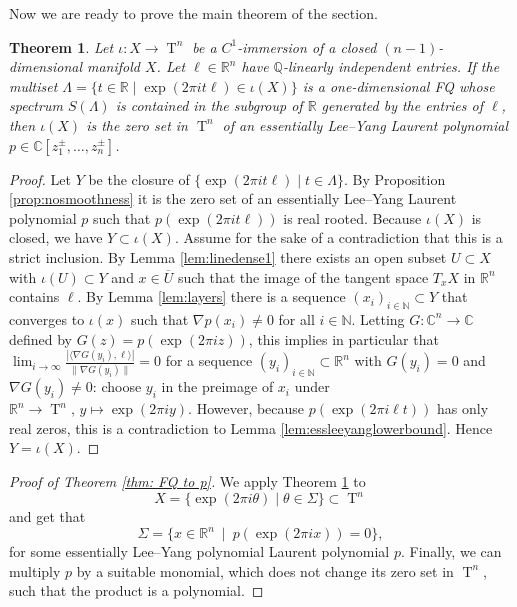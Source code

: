 \documentclass[11pt,letterpaper]{amsart}
\theoremstyle{definition}
\theoremstyle{plain}
\newtheorem{thm}[Def]{Theorem}
\newcommand{\T}{\operatorname{T}}
\newcommand{\C}{{\mathbb C}}
\newcommand{\R}{{\mathbb R}}
\newcommand{\Q}{{\mathbb Q}}
\newcommand{\N}{{\mathbb N}}
\begin{document}
Now we are ready to prove the main theorem of the section.
\begin{thm}\label{thm:FQimpliesalgebraic}
    Let $\iota\colon X\to\T^n$ be a $C^1$-immersion of a closed $(n-1)$-dimensional manifold $X$. Let $\ell\in\R^n$ have $\Q$-linearly independent entries. If the multiset $\Lambda=\{t\in\R\mid\exp(2\pi i t\ell)\in\iota(X)\}$ is a one-dimensional FQ whose spectrum $S(\Lambda)$ is contained in the subgroup of $\R$ generated by the entries of $\ell$, then $\iota(X)$ is the zero set in $\T^n$ of an essentially Lee--Yang Laurent polynomial $p\in\C[z_1^{\pm},\ldots,z_n^{\pm}]$.  
\end{thm}
\begin{proof}
    Let $Y$ be the closure of $\{\exp(2\pi i t\ell)\mid t\in\Lambda\}$. By Proposition \ref{prop:nosmoothness} it is the zero set of an essentially Lee--Yang Laurent polynomial $p$ such that $p(\exp(2\pi i t\ell))$ is real rooted. Because $\iota(X)$ is closed, we have $Y\subset\iota(X)$. Assume for the sake of a contradiction that this is a strict inclusion.   
    By Lemma \ref{lem:linedense1} there exists an open subset $U\subset X$ with $\iota(U)\subset Y$ and     
    $x\in\overline{U}$ such that the image of the tangent space ${T}_xX$ in $\R^n$ contains $\ell$. 
    By Lemma \ref{lem:layers} there is a sequence $(x_i)_{i\in\N}\subset Y$ that converges to $\iota(x)$ such that $\nabla p(x_i)\neq0$ for all $i\in\N$.    
    Letting $G\colon\C^n\to\C$ defined by $G(z)=p(\exp(2\pi i z))$, this implies in particular that $\lim_{i\to\infty}\frac{|\langle\nabla G(y_i),\ell\rangle|}{\|\nabla G(y_i)\|}=0$ for a sequence $(y_i)_{i\in\N}\subset\R^n$ with $G(y_i)=0$ and $\nabla G(y_i)\neq0$: choose $y_i$ in the preimage of $x_i$ under $\R^n\to\T^n,\,y\mapsto\exp(2\pi iy)$. However, because $p(\exp(2\pi i \ell t))$ has only real zeros, this is a contradiction to Lemma \ref{lem:essleeyanglowerbound}. Hence $Y=\iota(X)$.
\end{proof}


\begin{proof}[Proof of Theorem \ref{thm: FQ to p}]
    We apply Theorem \ref{thm:FQimpliesalgebraic} to
    \begin{equation*}
        X=\{\exp(2\pi i \theta)\mid\theta\in\Sigma\}\subset\T^n
    \end{equation*}
    and get that 
    \[\Sigma=\{x\in\R^n\ \mid \ p(\exp(2\pi i x))=0 \},\]
    for some essentially Lee--Yang polynomial Laurent polynomial $p$. Finally, we can multiply $p$ by a suitable monomial, which does not change its zero set in $\T^n$,  such that the product is a polynomial. 
\end{proof}
\end{document}
